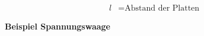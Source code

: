     \begin{minipage}{0.53\linewidth}
        \begin{footnotesize}
            \begin{center}
            \end{center}
        \end{footnotesize}
    \end{minipage}
    \begin{minipage}{0.46\linewidth}
        \begin{scriptsize}
            \begin{center}
                \begin{align*}
                    l &= \text{Abstand der Platten}
                \end{align*}
            \end{center}
        \end{scriptsize}
    \end{minipage}
    \vspace{1mm}

    \textbf{Beispiel Spannungswaage}